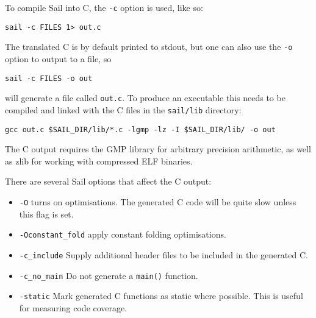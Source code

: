 To compile Sail into C, the \verb+-c+ option is used, like so:
\begin{verbatim}
sail -c FILES 1> out.c
\end{verbatim}
The translated C is by default printed to stdout, but one can also use
the \verb+-o+ option to output to a file, so
\begin{verbatim}
sail -c FILES -o out
\end{verbatim}
will generate a file called \verb+out.c+. To produce an executable
this needs to be compiled and linked with the C files in the
\verb+sail/lib+ directory:
\begin{verbatim}
gcc out.c $SAIL_DIR/lib/*.c -lgmp -lz -I $SAIL_DIR/lib/ -o out
\end{verbatim}
The C output requires the GMP library for arbitrary precision
arithmetic, as well as zlib for working with compressed ELF binaries.

There are several Sail options that affect the C output:
\begin{itemize}
  \item \verb+-O+ turns on optimisations. The generated C code will be
    quite slow unless this flag is set.
  \item \verb+-Oconstant_fold+ apply constant folding optimisations.
  \item \verb+-c_include+ Supply additional header files to be
    included in the generated C.
  \item \verb+-c_no_main+ Do not generate a \verb+main()+ function.
  \item \verb+-static+ Mark generated C functions as static where
    possible. This is useful for measuring code coverage.
\end{itemize}

